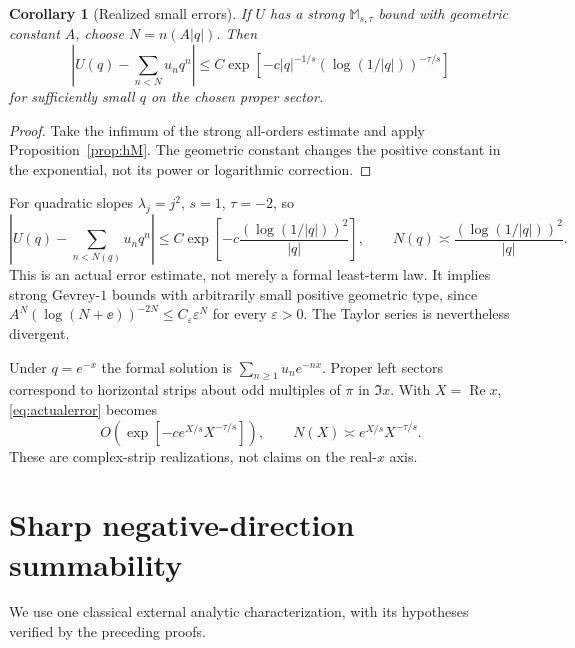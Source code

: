 \documentclass[11pt,a4paper]{article}
\numberwithin{equation}{section}
\newtheorem{corollary}[theorem]{Corollary}
\theoremstyle{definition}\newtheorem{definition}[theorem]{Definition}
\theoremstyle{remark}\newtheorem{remark}[theorem]{Remark}
\newcommand{\M}{\mathbb M}\newcommand{\CM}{\mathcal C_{\M}}
\DeclareMathOperator{\Rea}{Re}
\begin{document}
\begin{corollary}[Realized small errors]
\label{cor:actualerror}
If $U$ has a strong $\M_{s,\tau}$ bound with geometric constant $A$,
choose $N=n(A|q|)$. Then
\begin{equation}
 \left|U(q)-\sum_{n<N}u_nq^n\right|
 \le C\exp[-c|q|^{-1/s}(\log(1/|q|))^{-\tau/s}]
 \label{eq:actualerror}
\end{equation}
for sufficiently small $q$ on the chosen proper sector.
\end{corollary}
\begin{proof}
Take the infimum of the strong all-orders estimate and apply
Proposition~\ref{prop:hM}. The geometric constant changes the positive
constant in the exponential, not its power or logarithmic correction.
\end{proof}

For quadratic slopes $\lambda_j=j^2$, $s=1$, $\tau=-2$, so
\begin{equation}
 \left|U(q)-\sum_{n<N(q)}u_nq^n\right|
 \le C\exp\left[-c\frac{(\log(1/|q|))^2}{|q|}\right],
 \qquad N(q)\asymp\frac{(\log(1/|q|))^2}{|q|}.
 \label{eq:quadraticactual}
\end{equation}
This is an actual error estimate, not merely a formal least-term law.
It implies strong Gevrey-$1$ bounds with arbitrarily small positive
geometric type, since
$A^N(\log(N+\ee))^{-2N}\le C_\varepsilon\varepsilon^N$ for every
$\varepsilon>0$. The Taylor series is nevertheless divergent.

Under $q=e^{-x}$ the formal solution is
$\sum_{n\ge1}u_ne^{-nx}$. Proper left sectors correspond to horizontal
strips about odd multiples of $\pi$ in $\Im x$. With $X=\Rea x$,
\eqref{eq:actualerror} becomes
\begin{equation}
 O(\exp[-c e^{X/s}X^{-\tau/s}]),\qquad
 N(X)\asymp e^{X/s}X^{-\tau/s}.
 \label{eq:transserieserror}
\end{equation}
These are complex-strip realizations, not claims on the real-$x$ axis.

\section{Sharp negative-direction summability}
\label{sec:summability}
We use one classical external analytic characterization, with its
hypotheses verified by the preceding proofs.
\end{document}
